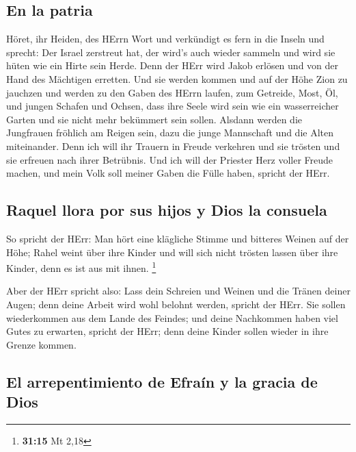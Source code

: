 \hypertarget{en-la-patria}{%
\subsection{En la patria}\label{en-la-patria}}

 Höret, ihr Heiden, des HErrn Wort und verkündigt es fern
in die Inseln und sprecht: Der Israel zerstreut hat, der wird's auch
wieder sammeln und wird sie hüten wie ein Hirte sein Herde.
 Denn der HErr wird Jakob erlösen und von der Hand des
Mächtigen erretten.  Und sie werden kommen und auf der
Höhe Zion zu jauchzen und werden zu den Gaben des HErrn laufen, zum
Getreide, Most, Öl, und jungen Schafen und Ochsen, dass ihre Seele wird
sein wie ein wasserreicher Garten und sie nicht mehr bekümmert sein
sollen.  Alsdann werden die Jungfrauen fröhlich am Reigen
sein, dazu die junge Mannschaft und die Alten miteinander. Denn ich will
ihr Trauern in Freude verkehren und sie trösten und sie erfreuen nach
ihrer Betrübnis.  Und ich will der Priester Herz voller
Freude machen, und mein Volk soll meiner Gaben die Fülle haben, spricht
der HErr.

\hypertarget{raquel-llora-por-sus-hijos-y-dios-la-consuela}{%
\subsection{Raquel llora por sus hijos y Dios la
consuela}\label{raquel-llora-por-sus-hijos-y-dios-la-consuela}}

 So spricht der HErr: Man hört eine klägliche Stimme und
bitteres Weinen auf der Höhe; Rahel weint über ihre Kinder und will sich
nicht trösten lassen über ihre Kinder, denn es ist aus mit ihnen.
\footnote{\textbf{31:15} Mt 2,18}

 Aber der HErr spricht also: Lass dein Schreien und
Weinen und die Tränen deiner Augen; denn deine Arbeit wird wohl belohnt
werden, spricht der HErr. Sie sollen wiederkommen aus dem Lande des
Feindes;  und deine Nachkommen haben viel Gutes zu
erwarten, spricht der HErr; denn deine Kinder sollen wieder in ihre
Grenze kommen.

\hypertarget{el-arrepentimiento-de-efrauxedn-y-la-gracia-de-dios}{%
\subsection{El arrepentimiento de Efraín y la gracia de
Dios}\label{el-arrepentimiento-de-efrauxedn-y-la-gracia-de-dios}}

